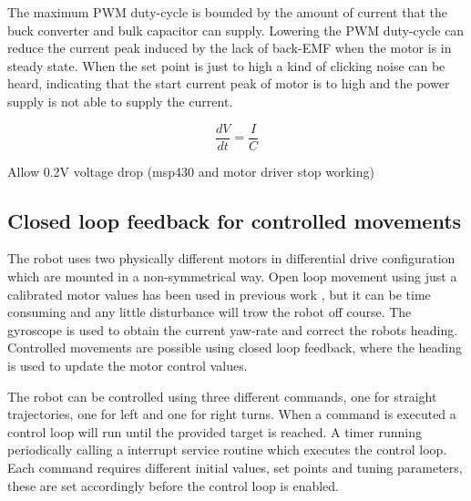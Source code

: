 
The maximum PWM duty-cycle is bounded by the amount of current that the buck converter and bulk capacitor can supply.
Lowering the PWM duty-cycle can reduce the current peak induced by the lack of back-EMF when the motor is in steady state.
When the set point is just to high a kind of clicking noise can be heard, indicating that the start current peak of motor is to high and the power supply is not able to supply the current.


\begin{equation}
\frac{dV}{dt} = \frac{I}{C}
\end{equation}

Allow 0.2V voltage drop (msp430 and motor driver stop working)


 


\subsection{Closed loop feedback for controlled movements}

The robot uses two physically different motors in differential drive configuration which are mounted in a non-symmetrical way.
Open loop movement using just a calibrated motor values has been used in previous work \cite{legoc_uist_2016}, but it can be time consuming and any little disturbance will trow the robot off course.
The gyroscope is used to obtain the current yaw-rate and correct the robots heading.
Controlled movements are possible using closed loop feedback, where the heading is used to update the motor control values.

The robot can be controlled using three different commands, one for straight trajectories, one for left and one for right turns.
When a command is executed a control loop will run until the provided target is reached.
A timer running periodically calling a interrupt service routine which executes the control loop.   
Each command requires different initial values, set points and tuning parameters, these are set accordingly before the control loop is enabled.

